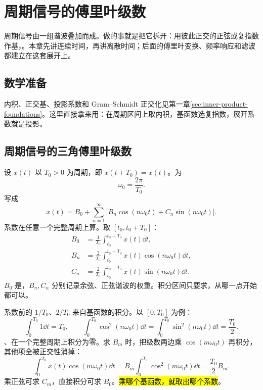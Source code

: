 \chapter{周期信号的傅里叶级数}
\label{chap:fourier-series}

周期信号由一组谐波叠加而成。做的事就是把它拆开：用彼此正交的正弦或复指数作基，。本章先讲连续时间，再讲离散时间；后面的傅里叶变换、频率响应和滤波都建立在这套展开上。

\section{数学准备}
\label{sec:fourier-inner-product-foundations}

内积、正交基、投影系数和 Gram--Schmidt 正交化见第一章\cref{sec:inner-product-foundations}。这里直接拿来用：在周期区间上取内积，基函数选复指数，展开系数就是投影。

\section{周期信号的三角傅里叶级数}
\label{sec:trigonometric-fourier-series}

设 $x(t)$ 以 $T_0>0$ 为周期，即 $x(t+T_0)=x(t)$。为
\begin{equation}
  \omega_0=\frac{2\pi}{T_0}.
  \label{eq:fundamental-angular-frequency}
\end{equation}
写成
\begin{equation}
  x(t)=B_0+\sum_{n=1}^{\infty}
  \bigl[B_n\cos(n\omega_0t)+C_n\sin(n\omega_0t)\bigr].
  \label{eq:trigonometric-fourier-series}
\end{equation}
系数在任意一个完整周期上算。取 $[t_0,t_0+T_0]$：
\begin{align}
  B_0&=\frac{1}{T_0}\int_{t_0}^{t_0+T_0}x(t)\dd t,\\
  B_n&=\frac{2}{T_0}\int_{t_0}^{t_0+T_0}x(t)\cos(n\omega_0t)\dd t,\\
  C_n&=\frac{2}{T_0}\int_{t_0}^{t_0+T_0}x(t)\sin(n\omega_0t)\dd t.
  \label{eq:trigonometric-fourier-coefficients}
\end{align}
$B_0$ 是，$B_n,C_n$ 分别记录余弦、正弦谐波的权重。积分区间只要求，从哪一点开始都可以。

系数前的 $1/T_0$、$2/T_0$ 来自基函数的积分。以 $[0,T_0]$ 为例：
\[
  \int_0^{T_0}1\dd t=T_0,\qquad
  \int_0^{T_0}\cos^2(n\omega_0t)\dd t
  =\int_0^{T_0}\sin^2(n\omega_0t)\dd t=\frac{T_0}{2}.
\]
、在一个完整周期上积分为零。求 $B_m$ 时，把级数两边乘 $\cos(m\omega_0t)$ 再积分，其他项全被正交性消掉：
\[
  \int_0^{T_0}x(t)\cos(m\omega_0t)\dd t
  =B_m\int_0^{T_0}\cos^2(m\omega_0t)\dd t
  =\frac{T_0}{2}B_m.
\]
乘正弦可求 $C_m$，直接积分可求 $B_0$。\hl{乘哪个基函数，就取出哪个系数}。

